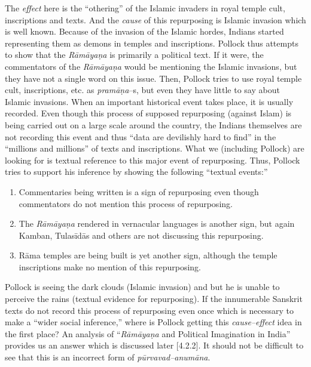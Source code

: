 The \textit{effect} here is the “othering” of the Islamic invaders in royal temple cult, inscriptions and texts. And the \textit{cause} of this repurposing is Islamic invasion which is well known. Because of the invasion of the Islamic hordes, Indians started representing them as demons in temples and inscriptions. Pollock thus attempts to show that the \textit{Rāmāyaṇa} is primarily a political text. If it were, the commentators of the \textit{Rāmāyaṇa} would be mentioning the Islamic invasions, but they have not a single word on this issue. Then, Pollock tries to use royal temple cult, inscriptions, etc. as \textit{pramāṇa}–s, but even they have little to say about Islamic invasions. When an important historical event takes place, it is usually recorded. Even though this process of supposed repurposing (against Islam) is being carried out on a large scale around the country, the Indians themselves are not recording this event and thus “data are devilishly hard to find” in the “millions and millions” of texts and inscriptions. What we (including Pollock) are looking for is textual reference to this major event of repurposing. Thus, Pollock tries to support his inference by showing the following “textual events:”

\vspace{-.3cm}

\begin{enumerate}
\itemsep=0pt
\item Commentaries being written is a sign of repurposing even though commentators do not mention this process of repurposing.

 \item The \textit{Rāmāyaṇa }rendered in vernacular languages is another sign, but again Kamban, Tulasīdās and others are not discussing this repurposing.

 \item Rāma temples are being built is yet another sign, although the temple inscriptions make no mention of this repurposing.

\end{enumerate}

\vspace{-.3cm}

Pollock is seeing the dark clouds (Islamic invasion) and but he is unable to perceive the rains (textual evidence for repurposing). If the innumerable Sanskrit texts do not record this process of repurposing even once which is necessary to make a “wider social inference,” where is Pollock getting this \textit{cause–effect} idea in the first place? An analysis of “\textit{Rāmāyaṇa }and Political Imagination in India” provides us an answer which is discussed later [4.2.2]. It should not be difficult to see that this is an incorrect form of \textit{pūrvavad–anumāna}.

